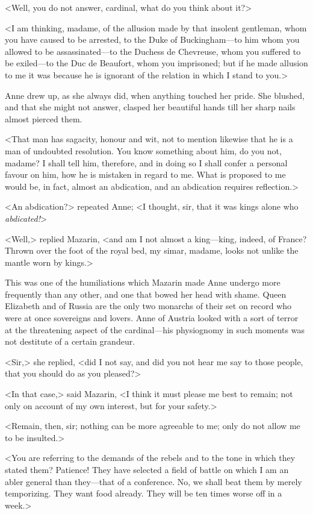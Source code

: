 <Well, you do not answer, cardinal, what do you think about it?>

<I am thinking, madame, of the allusion made by that insolent gentleman, whom you have caused to be arrested, to the Duke of Buckingham—to him whom you allowed to be assassinated—to the Duchess de Chevreuse, whom you suffered to be exiled—to the Duc de Beaufort, whom you imprisoned; but if he made allusion to me it was because he is ignorant of the relation in which I stand to you.>

Anne drew up, as she always did, when anything touched her pride. She blushed, and that she might not answer, clasped her beautiful hands till her sharp nails almost pierced them.

<That man has sagacity, honour and wit, not to mention likewise that he is a man of undoubted resolution. You know something about him, do you not, madame? I shall tell him, therefore, and in doing so I shall confer a personal favour on him, how he is mistaken in regard to me. What is proposed to me would be, in fact, almost an abdication, and an abdication requires reflection.>

<An abdication?> repeated Anne; <I thought, sir, that it was kings alone who \emph{abdicated!}>

<Well,> replied Mazarin, <and am I not almost a king—king, indeed, of France? Thrown over the foot of the royal bed, my simar, madame, looks not unlike the mantle worn by kings.>

This was one of the humiliations which Mazarin made Anne undergo more frequently than any other, and one that bowed her head with shame. Queen Elizabeth and  of Russia are the only two monarchs of their set on record who were at once sovereigns and lovers. Anne of Austria looked with a sort of terror at the threatening aspect of the cardinal—his physiognomy in such moments was not destitute of a certain grandeur.

<Sir,> she replied, <did I not say, and did you not hear me say to those people, that you should do as you pleased?>

<In that case,> said Mazarin, <I think it must please me best to remain; not only on account of my own interest, but for your safety.>

<Remain, then, sir; nothing can be more agreeable to me; only do not allow me to be insulted.>

<You are referring to the demands of the rebels and to the tone in which they stated them? Patience! They have selected a field of battle on which I am an abler general than they—that of a conference. No, we shall beat them by merely temporizing. They want food already. They will be ten times worse off in a week.>

